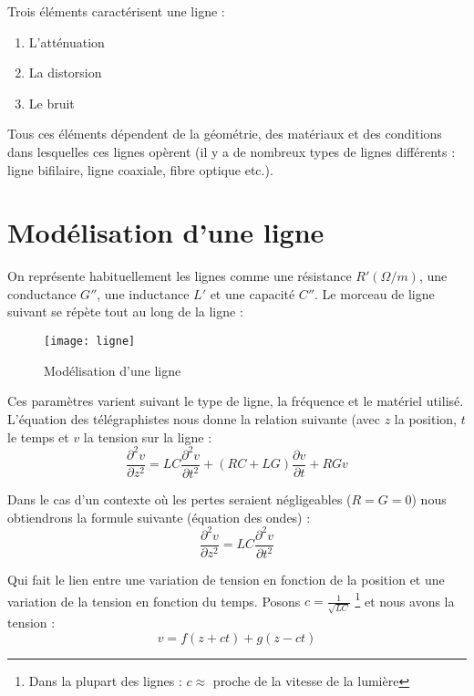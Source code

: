 Trois éléments caractérisent une ligne :
\begin{enumerate}
\item L'atténuation
\item La distorsion
\item Le bruit
\end{enumerate}

Tous ces éléments dépendent de la géométrie, des matériaux et des conditions dans lesquelles ces lignes opèrent (il y a de nombreux types de lignes différents : ligne bifilaire, ligne coaxiale, fibre optique etc.).

\section{Modélisation d'une ligne}

On représente habituellement les lignes comme une résistance $R'(\Omega / m)$, une conductance $G''$, une inductance $L'$ et une capacité $C''$. Le morceau de ligne suivant se répète tout au long de la ligne :

\begin{figure}[H]
    \centering
    \texttt{[image: ligne]}
    \caption{Modélisation d'une ligne}
\end{figure}

Ces paramètres varient suivant le type de ligne, la fréquence et le matériel utilisé. L'équation des télégraphistes nous donne la relation suivante (avec $z$ la position, $t$ le temps et $v$ la tension sur la ligne :
\begin{equation*}
\frac{\partial^2v}{\partial z^2} = LC\frac{\partial^2v}{\partial t^2}+(RC+LG)\frac{\partial v}{\partial t}+RGv
\end{equation*}

Dans le cas d'un contexte où les pertes seraient négligeables ($R=G=0$) nous obtiendrons la formule suivante (équation des ondes) : 
\begin{equation*}
\frac{\partial^2v}{\partial z^2} = LC\frac{\partial^2v}{\partial t^2}
\end{equation*}

Qui fait le lien entre une variation de tension en fonction de la position et une variation de la tension en fonction du temps. Posons $c = \frac{1}{\sqrt{LC}}$ \footnote{Dans la plupart des lignes : $c \approx$ proche de la vitesse de la lumière} et nous avons la tension :
\begin{equation*}
v = f(z+ct) + g(z - ct)
\end{equation*}

